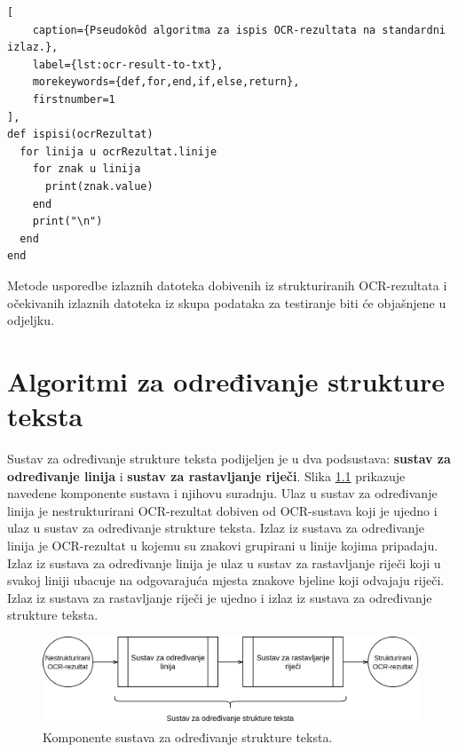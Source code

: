 \documentclass[times, utf8, zavrsni]{fer}
\begin{document}
\begin{lstlisting}[
    caption={Pseudokôd algoritma za ispis OCR-rezultata na standardni izlaz.},
    label={lst:ocr-result-to-txt},
    morekeywords={def,for,end,if,else,return},
    firstnumber=1
],
def ispisi(ocrRezultat)
  for linija u ocrRezultat.linije
    for znak u linija
      print(znak.value)
    end
    print("\n")
  end
end
\end{lstlisting}

Metode usporedbe izlaznih datoteka dobivenih iz strukturiranih OCR-rezultata i
očekivanih izlaznih datoteka iz skupa podataka za testiranje biti će objašnjene
u odjeljku.
















\chapter{Algoritmi za određivanje strukture teksta}
Sustav za određivanje strukture teksta podijeljen je u dva podsustava:
\textbf{sustav za određivanje linija} i \textbf{sustav za rastavljanje riječi}.
Slika \ref{fig:sustav-03} prikazuje navedene komponente sustava i njihovu
suradnju. Ulaz u sustav za određivanje linija je nestrukturirani OCR-rezultat
dobiven od OCR-sustava koji je ujedno i ulaz u sustav za određivanje strukture
teksta. Izlaz iz sustava za određivanje linija je OCR-rezultat
u kojemu su znakovi grupirani u linije kojima pripadaju. Izlaz
iz sustava za određivanje linija je ulaz u sustav za rastavljanje riječi koji
u svakoj liniji ubacuje na odgovarajuća mjesta znakove bjeline koji odvajaju
riječi. Izlaz iz sustava za rastavljanje riječi je ujedno i izlaz iz sustava
za određivanje strukture teksta.
\begin{figure}[htb]
    \centering
    \captionsetup{justification=centering,margin=2cm}
    \includegraphics[width=\textwidth]{images/sustav-03.png}
    \caption{
        Komponente sustava za određivanje strukture teksta.
    }
    \label{fig:sustav-03}
\end{figure}
\end{document}
